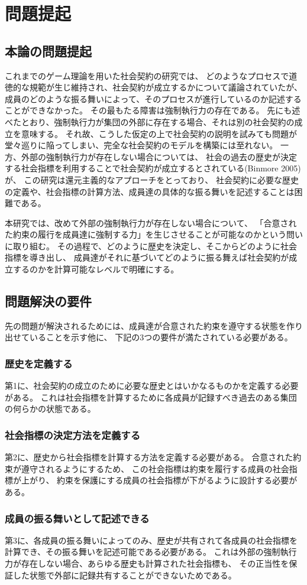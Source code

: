 \chapter{問題提起}
\section{本論の問題提起}
これまでのゲーム理論を用いた社会契約の研究では、
どのようなプロセスで道徳的な規範が生じ維持され、社会契約が成立するかについて議論されていたが、
成員のどのような振る舞いによって、そのプロセスが進行しているのか記述することができなかった。
その最もたる障害は強制執行力の存在である。
先にも述べたとおり、強制執行力が集団の外部に存在する場合、それは別の社会契約の成立を意味する。
それ故、こうした仮定の上で社会契約の説明を試みても問題が堂々巡りに陥ってしまい、完全な社会契約のモデルを構築には至れない。
一方、外部の強制執行力が存在しない場合については、
社会の過去の歴史が決定する社会指標を利用することで社会契約が成立するとされている(Binmore 2005\cite{binmore2005})が、
この研究は還元主義的なアプローチをとっており、
社会契約に必要な歴史の定義や、社会指標の計算方法、成員達の具体的な振る舞いを記述することは困難である。

本研究では、改めて外部の強制執行力が存在しない場合について、
「合意された約束の履行を成員達に強制する力」を生じさせることが可能なのかという問いに取り組む。
その過程で、どのように歴史を決定し、そこからどのように社会指標を導き出し、
成員達がそれに基づいてどのように振る舞えば社会契約が成立するのかを計算可能なレベルで明確にする。

\section{問題解決の要件}
先の問題が解決されるためには、成員達が合意された約束を遵守する状態を作り出せていることを示す他に、
下記の3つの要件が満たされている必要がある。

\subsection{歴史を定義する}
第1に、社会契約の成立のために必要な歴史とはいかなるものかを定義する必要がある。
これは社会指標を計算するために各成員が記録すべき過去のある集団の何らかの状態である。

\subsection{社会指標の決定方法を定義する}
第2に、歴史から社会指標を計算する方法を定義する必要がある。
合意された約束が遵守されるようにするため、
この社会指標は約束を履行する成員の社会指標が上がり、
約束を保護にする成員の社会指標が下がるように設計する必要がある。


\subsection{成員の振る舞いとして記述できる}
第3に、各成員の振る舞いによってのみ、歴史が共有されて各成員の社会指標を計算でき、その振る舞いを記述可能である必要がある。
これは外部の強制執行力が存在しない場合、あらゆる歴史も計算された社会指標も、
その正当性を保証した状態で外部に記録共有することができないためである。